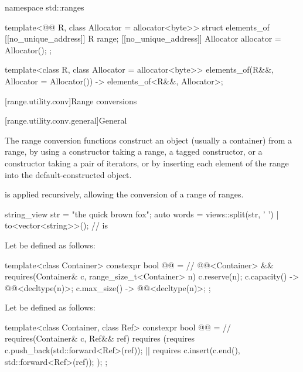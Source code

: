 \begin{codeblock}
namespace std::ranges {
  template<@@ R, class Allocator = allocator<byte>>
  struct elements_of {
    [[no_unique_address]] R range;
    [[no_unique_address]] Allocator allocator = Allocator();
  };

  template<class R, class Allocator = allocator<byte>>
    elements_of(R&&, Allocator = Allocator()) -> elements_of<R&&, Allocator>;
}
\end{codeblock}

[range.utility.conv]{Range conversions}

[range.utility.conv.general]{General}

\pnum
The range conversion functions construct
an object (usually a container) from a range,
by using a constructor taking a range,
a  tagged constructor, or
a constructor taking a pair of iterators, or
by inserting each element of the range into the default-constructed object.

\pnum
{} is applied recursively,
allowing the conversion of a range of ranges.

\begin{example}
\begin{codeblock}
string_view str = "the quick brown fox";
auto words = views::split(str, ' ') | to<vector<string>>();
//  is 
\end{codeblock}
\end{example}

\pnum
Let  be defined as follows:
\begin{codeblock}
template<class Container>
constexpr bool @@ =          // \expos
  @@<Container> &&
  requires(Container& c, range_size_t<Container> n) {
    c.reserve(n);
    { c.capacity() } -> @@<decltype(n)>;
    { c.max_size() } -> @@<decltype(n)>;
  };
\end{codeblock}

\pnum
Let  be defined as follows:
\begin{codeblock}
template<class Container, class Ref>
constexpr bool @@ =          // \expos
  requires(Container& c, Ref&& ref) {
    requires (requires { c.push_back(std::forward<Ref>(ref)); } ||
              requires { c.insert(c.end(), std::forward<Ref>(ref)); });
  };
\end{codeblock}


